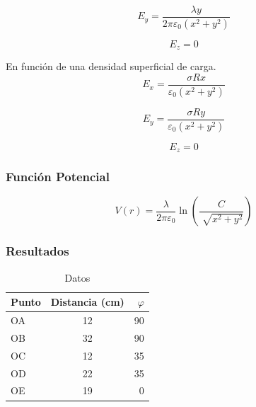\documentclass{article}
\begin{document}
	\begin{equation}
		E_y = \frac{\lambda y}{2 \pi \varepsilon_0 (x^2 + y^2)}
	\end{equation}

    \begin{equation}
		E_z = 0
	\end{equation}

En función de una densidad superficial de carga.
	\begin{equation}
    	E_x = \frac{\sigma Rx}{\varepsilon_0 (x^2 + y^2)}
    \end{equation}

	\begin{equation}
		E_y = \frac{\sigma Ry}{\varepsilon_0 (x^2 + y^2)}
	\end{equation}

    \begin{equation}
		E_z = 0
	\end{equation}
    
\subsubsection{Función Potencial}

\begin{equation}
		V(r) = \frac{\lambda}{2 \pi \varepsilon_0}\ln \left(\frac{C}{\sqrt[]{x^2 + y^2}}\right)
	\end{equation}

\subsubsection{Resultados}
	\begin{table}[H]
    \centering
    \begin{tabular}{|l | c | r|}
    	\hline
		Punto & Distancia (cm) & $ \varphi $ \\ \hline
        OA & 12 & 90 \\
        OB & 32 & 90 \\
        OC & 12 & 35 \\
        OD & 22 & 35 \\
        OE & 19 & 0 \\ \hline
	\end{tabular}
    \caption{Datos}
    \end{table}
    
\end{document}
